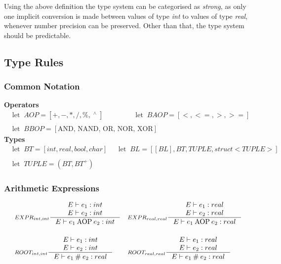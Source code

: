 Using the above definition the type system can be categorised as \emph{strong}, as only one implicit conversion is made between values of type \emph{int} to values of type \emph{real}, whenever number precision can be preserved. Other than that, the type system should be predictable.



\subsection{Type Rules}

\subsubsection{Common Notation}
\textbf{Operators}
\begin{align*}
&\textrm{let} \;\; AOP = [+, -, *, /, \%, \;^\wedge{} \;]
&
&\textrm{let} \;\; BAOP = [<, <=, >, >=]
\\\\
&\textrm{let} \;\; BBOP = [\textrm{AND, NAND, OR, NOR, XOR}]
\end{align*}
\textbf{Types}
\begin{align*}
&\textrm{let} \;\; BT = [int, real, bool, char]
&
&\textrm{let} \;\; BL = [[BL], BT, TUPLE, struct<TUPLE>]
\\\\
&\textrm{let} \;\; TUPLE = (BT, BT^+)
\end{align*}

\subsubsection{Arithmetic Expressions}
\begin{align*}
&\inference[$EXPR_{int,int}$]{E \vdash e_1 : int \\
                       E \vdash e_2 : int}
                    {E \vdash e_1 \mathbin{\textrm{AOP}} e_2 : int}
&
&\inference[$EXPR_{real,real}$]{E \vdash e_1 : real \\
                       E \vdash e_2 : real}
                    {E \vdash e_1 \mathbin{\textrm{AOP}} e_2 : real}
\\\\  
&\inference[$ROOT_{int,int}$]{E \vdash e_1 : int \\
                       E \vdash e_2 : int}
                    {E \vdash e_1 \mathbin{\#} e_2 : real}
&
&\inference[$ROOT_{real,real}$]{E \vdash e_1 : real \\
                       E \vdash e_2 : real}
                    {E \vdash e_1 \mathbin{\#} e_2 : real}
\end{align*}

